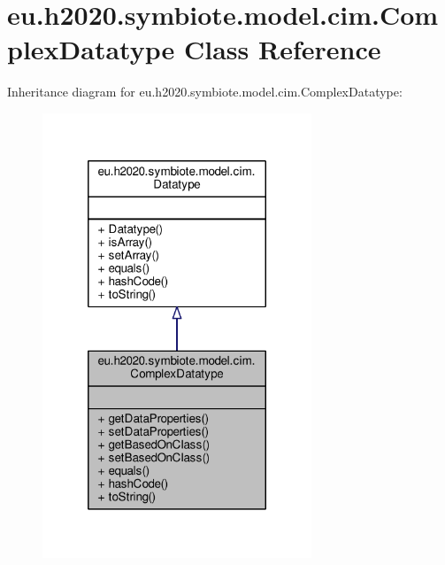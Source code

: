 \hypertarget{classeu_1_1h2020_1_1symbiote_1_1model_1_1cim_1_1ComplexDatatype}{}\section{eu.\+h2020.\+symbiote.\+model.\+cim.\+Complex\+Datatype Class Reference}
\label{classeu_1_1h2020_1_1symbiote_1_1model_1_1cim_1_1ComplexDatatype}


Inheritance diagram for eu.\+h2020.\+symbiote.\+model.\+cim.\+Complex\+Datatype\+:\nopagebreak
\begin{figure}[H]
\begin{center}
\leavevmode
\includegraphics[width=228pt]{classeu_1_1h2020_1_1symbiote_1_1model_1_1cim_1_1ComplexDatatype__inherit__graph}
\end{center}
\end{figure}



